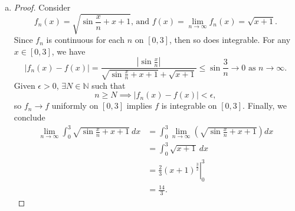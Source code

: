 \begin{Exercise}
\begin{enumerate}[a)]
\item
\begin{proof}
Consider $$f_n(x) = \sqrt{\sin{\frac{x}{n}}+x+1}\text{, and } f(x)=\lim_{n\to\infty}f_n(x) = \sqrt{x+1}.$$
Since $f_n$ is continuous for each $n$ on $[0,3]$, then so does integrable.
For any $x\in[0, 3]$, we have $$ \left| f_n(x) - f(x) \right| =
\frac{\left| \sin{ \frac{x}{n} } \right| }{  \sqrt{ \sin{ \frac{x}{n} }+x+1} + \sqrt{x+1}} \leq
\sin{\frac{3}{n}}\to 0 \mbox{ as }n\to\infty.$$
Given $\epsilon > 0$, $\exists N\in\mathbb{N}$ such that $$n \geq N \implies \left| f_n(x) - f(x) \right| < \epsilon,$$
so $f_n \to f$ uniformly on $[0,3]$ implies $f$ is integrable on $[0,3]$. Finally, we conclude
\begin{align*}
\lim_{n\to\infty}\int_{0}^{3} \sqrt{\sin{\frac{x}{n}}+x+1}\ dx
&= \int_{0}^{3} \lim_{n\to\infty}\left( \sqrt{\sin{\frac{x}{n}}+x+1} \right) dx \\
&= \int_{0}^{3} \sqrt{x+1}\ dx \\
&= \left. \frac{2}{3} \left( x+1 \right)^{ \frac{3}{2} } \right|_{0}^{3} \\
&= \frac{14}{3}.
\end{align*}
\end{proof}
\end{enumerate}
\end{Exercise}